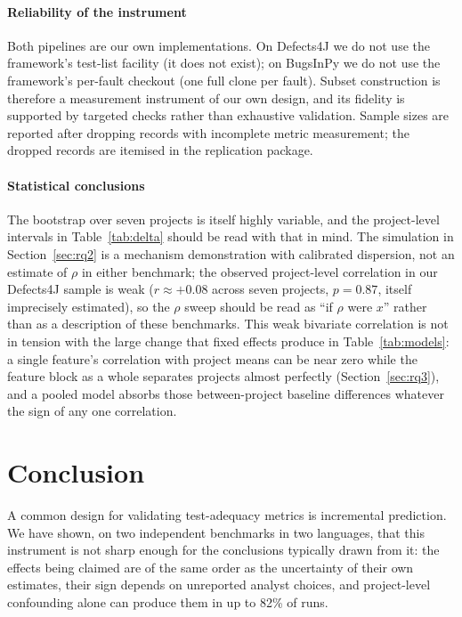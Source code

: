 \documentclass[preprint,12pt]{elsarticle}
\begin{document}
\paragraph{Reliability of the instrument} Both pipelines are our own
implementations. On Defects4J we do not use the framework's test-list
facility (it does not exist); on BugsInPy we do not use the framework's
per-fault checkout (one full clone per fault). Subset construction is
therefore a measurement instrument of our own design, and its fidelity is
supported by targeted checks rather than exhaustive validation. Sample
sizes are reported after dropping records with incomplete metric
measurement; the dropped records are itemised in the replication package.

\paragraph{Statistical conclusions} The bootstrap over seven projects is
itself highly variable, and the project-level intervals in
Table~\ref{tab:delta} should be read with that in mind. The simulation in
Section~\ref{sec:rq2} is a mechanism demonstration with calibrated
dispersion, not an estimate of $\rho$ in either benchmark; the observed
project-level correlation in our Defects4J sample is weak
($r \approx +0.08$ across seven projects, $p = 0.87$, itself
imprecisely estimated),
so the $\rho$ sweep should be read as ``if $\rho$ were $x$'' rather than as
a description of these benchmarks. This weak bivariate correlation is not in
tension with the large change that fixed effects produce in
Table~\ref{tab:models}: a single feature's correlation with project means can
be near zero while the feature block as a whole separates projects almost
perfectly (Section~\ref{sec:rq3}), and a pooled model absorbs those
between-project baseline differences whatever the sign of any one
correlation.

\section{Conclusion}
\label{sec:conclusion}

A common design for validating test-adequacy metrics is incremental
prediction. We have shown, on two independent benchmarks in two
languages, that this instrument is not sharp enough for the conclusions
typically drawn from it: the effects being claimed are of the same order as
the uncertainty of their own estimates, their sign depends on unreported
analyst choices, and project-level confounding alone can produce them in up to 82\% of
runs.
\end{document}

